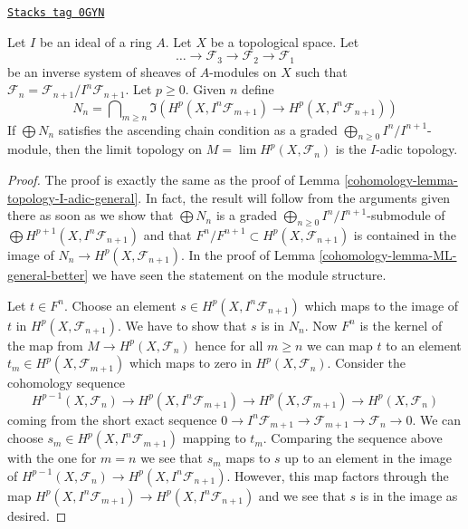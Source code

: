 \begin{lemma}
\label{cohomology-lemma-topology-I-adic-general-better}
\href{https://stacks.math.columbia.edu/tag/0GYN}{\texttt{Stacks tag 0GYN}}

Let $I$ be an ideal of a ring $A$. Let $X$ be a topological space. Let
$$
\ldots \to \mathcal{F}_3 \to \mathcal{F}_2 \to \mathcal{F}_1
$$
be an inverse system of sheaves of $A$-modules on $X$ such that
$\mathcal{F}_n = \mathcal{F}_{n + 1}/I^n\mathcal{F}_{n + 1}$.
Let $p \geq 0$. Given $n$ define
$$
N_n =
\bigcap\nolimits_{m \geq n}
\Im\left(
H^p(X, I^n\mathcal{F}_{m + 1}) \to H^p(X, I^n\mathcal{F}_{n + 1})
\right)
$$
If $\bigoplus N_n$ satisfies the ascending chain condition as a graded
$\bigoplus_{n \geq 0} I^n/I^{n + 1}$-module, then
the limit topology on $M = \lim H^p(X, \mathcal{F}_n)$
is the $I$-adic topology.
\end{lemma}

\begin{proof}

The proof is exactly the same as the proof of
Lemma \ref{cohomology-lemma-topology-I-adic-general}.
In fact, the result will follow from the arguments given there
as soon as we show that
$\bigoplus N_n$ is a graded $\bigoplus_{n \geq 0} I^n/I^{n + 1}$-submodule
of $\bigoplus H^{p + 1}(X, I^n\mathcal{F}_{n + 1})$
and that $F^n/F^{n + 1} \subset H^p(X, \mathcal{F}_{n + 1})$
is contained in the image of $N_n \to H^p(X, \mathcal{F}_{n + 1})$.
In the proof of Lemma \ref{cohomology-lemma-ML-general-better}
we have seen the statement on the module structure.

\medskip\noindent
Let $t \in F^n$. Choose an element $s \in H^p(X, I^n\mathcal{F}_{n + 1})$
which maps to the image of $t$ in $H^p(X, \mathcal{F}_{n + 1})$. We have
to show that $s$ is in $N_n$. Now $F^n$ is the kernel of the map from
$M \to H^p(X, \mathcal{F}_n)$ hence for all $m \geq n$ we can map $t$
to an element $t_m \in H^p(X, \mathcal{F}_{m + 1})$ which maps to zero
in $H^p(X, \mathcal{F}_n)$. Consider the cohomology sequence
$$
H^{p - 1}(X, \mathcal{F}_n) \to
H^p(X, I^n\mathcal{F}_{m + 1}) \to
H^p(X, \mathcal{F}_{m + 1}) \to
H^p(X, \mathcal{F}_n)
$$
coming from the short exact sequence
$0 \to I^n\mathcal{F}_{m + 1} \to \mathcal{F}_{m + 1} \to \mathcal{F}_n \to 0$.
We can choose $s_m \in H^p(X, I^n\mathcal{F}_{m + 1})$ mapping to $t_m$.
Comparing the sequence above with the one for $m = n$ we see that
$s_m$ maps to $s$ up to an element in the image of
$H^{p - 1}(X, \mathcal{F}_n) \to H^p(X, I^n\mathcal{F}_{n + 1})$.
However, this map factors through the map
$H^p(X, I^n\mathcal{F}_{m + 1}) \to H^p(X, I^n\mathcal{F}_{n + 1})$
and we see that $s$ is in the image as desired.
\end{proof}

